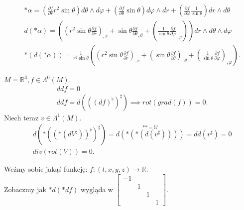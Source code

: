 \documentclass[../main.tex]{subfiles}
\begin{document}
\begin{przyklad}
\begin{align*}
        &\ast \alpha = \left( \frac{\partial f}{\partial r} r^2\sin\theta \right) d\theta\land d\varphi + \left( \frac{\partial f}{\partial \theta} \sin\theta \right) d\varphi\land dr + \left( \frac{\partial f}{\partial \varphi} \frac{1}{\sin\theta} \right) dr\land d\theta\\
        &d(\ast \alpha) = \left( \left(r^2\sin\theta \frac{\partial f}{\partial r} \right)_{,r} +\sin\theta \frac{\partial f}{\partial \theta} _{,\theta}  + \left( \frac{1}{\sin\theta} \frac{\partial f}{\partial \varphi} _{,\varphi} \right)  \right) dr\land d\theta\land d\varphi\\
        & \ast(d(\ast \alpha)) = \frac{1}{r^2\sin\theta}\left( \left(r^2\sin\theta \frac{\partial f}{\partial r} \right)_{,r} + \left(\sin\theta \frac{\partial f}{\partial \theta} \right)_{,\theta} + \left(\frac{1}{\sin\theta}\frac{\partial f}{\partial \varphi} \right)_{,\varphi} \right)
    .\end{align*}
\end{przyklad}
\begin{przyklad}
    $M = \mathbb{R}^3, f\in \Lambda^0(M)$.
    \begin{align*}
     &dd f = 0\\
     &ddf = d\left( \left( (df)^\flat \right)^\sharp \right) \implies rot( grad (f) ) = 0
    .\end{align*}
    Niech teraz $v\in \Lambda^1(M)$.
     \begin{align*}
         &d\left(\ast\left(\left(\ast(d V^\sharp)\right)^\flat\right)^\sharp\right) = \overset{\ast\ast=\mathbb{I}?}{d(\ast(\ast(d(v^\sharp))))} = dd(v^\sharp) = 0\\
         &div(rot (V)) = 0
    .\end{align*}
\end{przyklad}
Weźmy sobie jakąś funkcję: $f: (t,x,y,z)\to \mathbb{R}$.\\
        Zobaczmy jak $\ast d(\ast d f)$ wygląda w  $\begin{bmatrix} -1&&&\\&1&&\\&&1&\\&&&1 \end{bmatrix} $.
\end{document}
